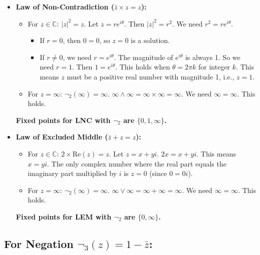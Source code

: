 \documentclass{article}
\begin{document}
	\begin{itemize}
		\item \textbf{Law of Non-Contradiction ($\bar{z} \times z = z$):}
		\begin{itemize}
			\item For $z \in \mathbb{C}$: $|z|^2 = z$. Let $z = re^{i\theta}$. Then $|z|^2 = r^2$. We need $r^2 = re^{i\theta}$.
			\begin{itemize}
				\item If $r = 0$, then $0 = 0$, so $z = 0$ is a solution.
				\item If $r \neq 0$, we need $r = e^{i\theta}$. The magnitude of $e^{i\theta}$ is always 1. So we need $r = 1$. Then $1 = e^{i\theta}$. This holds when $\theta = 2\pi k$ for integer $k$. This means $z$ must be a positive real number with magnitude 1, i.e., $z = 1$.
			\end{itemize}
			\item For $z = \infty$: $\neg_2(\infty) = \infty$. $\infty \wedge \infty = \infty \times \infty = \infty$. We need $\infty = \infty$. This holds.
		\end{itemize}
		\textbf{Fixed points for LNC with $\neg_2$ are $\{0, 1, \infty\}$.}
		
		\item \textbf{Law of Excluded Middle ($\bar{z} + z = z$):}
		\begin{itemize}
			\item For $z \in \mathbb{C}$: $2 \times \text{Re}(z) = z$. Let $z = x + yi$. $2x = x + yi$. This means $x = yi$. The only complex number where the real part equals the imaginary part multiplied by $i$ is $z = 0$ (since $0 = 0i$).
			\item For $z = \infty$: $\neg_2(\infty) = \infty$. $\infty \vee \infty = \infty + \infty = \infty$. We need $\infty = \infty$. This holds.
		\end{itemize}
		\textbf{Fixed points for LEM with $\neg_2$ are $\{0, \infty\}$.}
	\end{itemize}
	
	\subsection{For Negation $\neg_3(z) = 1 - \bar{z}$:}
	
\end{document}
